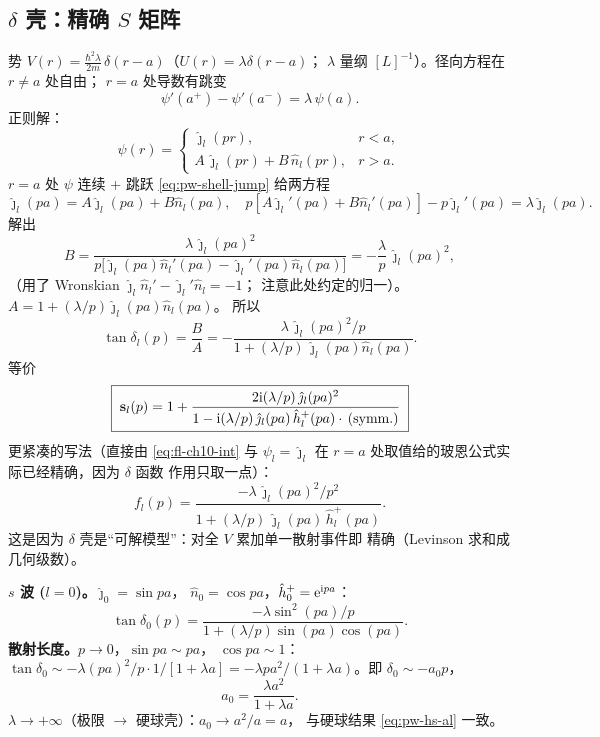 \subsection{$\delta$ 壳：精确 $S$ 矩阵}\label{sec:pw-delta-shell}

势 $V(r)=\frac{\hbar^2 \lambda}{2m}\,\delta(r-a)$（$U(r)=\lambda\delta(r-a)$；
$\lambda$ 量纲 $[L]^{-1}$）。径向方程在 $r\ne a$ 处自由；
$r=a$ 处导数有跳变
\begin{equation}\label{eq:pw-shell-jump}
\psi'(a^+)-\psi'(a^-)=\lambda\,\psi(a).
\end{equation}
正则解：
\[
\psi(r)=\begin{cases}
\hat\jmath_l(pr),& r<a,\\
A\,\hat\jmath_l(pr)+B\,\hat n_l(pr),& r>a.
\end{cases}
\]
$r=a$ 处 $\psi$ 连续 + 跳跃 \eqref{eq:pw-shell-jump} 给两方程
\[
\hat\jmath_l(pa)=A\hat\jmath_l(pa)+B\hat n_l(pa),\quad
p[A\hat\jmath_l'(pa)+B\hat n_l'(pa)]-p\hat\jmath_l'(pa)=\lambda\hat\jmath_l(pa).
\]
解出
\begin{equation}\label{eq:pw-shell-AB}
B=\frac{\lambda\,\hat\jmath_l(pa)^2}{p\bigl[\hat\jmath_l(pa)\hat n_l'(pa)-\hat\jmath_l'(pa)\hat n_l(pa)\bigr]}
=-\frac{\lambda}{p}\,\hat\jmath_l(pa)^2,
\end{equation}
（用了 Wronskian $\hat\jmath_l\hat n_l'-\hat\jmath_l'\hat n_l=-1$；
注意此处约定的归一）。$A=1+(\lambda/p)\hat\jmath_l(pa)\hat n_l(pa)$。
所以
\begin{equation}\label{eq:pw-shell-tand}
\tan\delta_l(p)=\frac{B}{A}
=-\frac{\lambda\,\hat\jmath_l(pa)^2/p}{1+(\lambda/p)\,\hat\jmath_l(pa)\hat n_l(pa)}.
\end{equation}
等价
\begin{equation}\label{eq:pw-shell-S}
\boxed{\;\mathbf s_l(p)
=1+\frac{2\mathrm{i}(\lambda/p)\,\hat\jmath_l(pa)^2}
       {1-\mathrm{i}(\lambda/p)\,\hat\jmath_l(pa)\,\hat h_l^+(pa)\cdot
        \,\text{(symm.)}}\;}
\end{equation}
更紧凑的写法（直接由 \eqref{eq:fl-ch10-int} 与 $\psi_l=\hat\jmath_l$
在 $r=a$ 处取值给的玻恩公式实际已经精确，因为 $\delta$ 函数
作用只取一点）：
\begin{equation}\label{eq:pw-shell-fl}
f_l(p)=\frac{-\lambda\,\hat\jmath_l(pa)^2/p^2}
       {1+(\lambda/p)\,\hat\jmath_l(pa)\,\hat h_l^+(pa)}.
\end{equation}
这是因为 $\delta$ 壳是“可解模型”：对全 $V$ 累加单一散射事件即
精确（Levinson 求和成几何级数）。

\textbf{$s$ 波 ($l=0$)。}$\hat\jmath_0=\sin pa$，
$\hat n_0=\cos pa$，$\hat h_0^+=\mathrm{e}^{\mathrm{i} pa}$：
\[
\tan\delta_0(p)=\frac{-\lambda\sin^2(pa)/p}
                     {1+(\lambda/p)\sin(pa)\cos(pa)}.
\]
\textbf{散射长度。}$p\to 0$，$\sin pa\sim pa$，
$\cos pa\sim 1$：$\tan\delta_0\sim -\lambda(pa)^2/p\cdot1/[1+\lambda a]
=-\lambda p a^2/(1+\lambda a)$。即 $\delta_0\sim
-a_0 p$，
\begin{equation}\label{eq:pw-shell-a0}
a_0=\frac{\lambda a^2}{1+\lambda a}.
\end{equation}
$\lambda\to+\infty$（极限 $\to$ 硬球壳）：$a_0\to a^2/a=a$，
与硬球结果 \eqref{eq:pw-hs-al} 一致。

